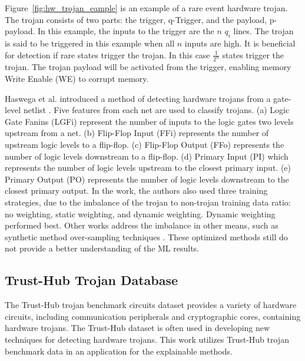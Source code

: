 Figure~\ref{fig:hw_trojan_eample} is an example of a rare event hardware trojan.
The trojan consists of two parts: the trigger, q-Trigger, and the payload,
p-payload. In this example, the inputs to the trigger are the $n$ $q_i$ lines.
The trojan is said to be triggered in this example when all $n$ inputs are high.
It is beneficial for detection if rare states trigger the trojan. In this case
$\frac{1}{2^n}$ states trigger the trojan. The trojan payload will be activated
from the trigger, enabling memory Write Enable (WE) to corrupt
memory\cite{4484928}.

Haswega et al. introduced a method of detecting hardware trojans from a
gate-level netlist \cite{7604700, hasegawa2020hardware}. Five features from each
net are used to classify trojans. (a) Logic Gate Fanins (LGFi) represent the
number of inputs to the logic gates two levels upstream from a net. (b)
Flip-Flop Input (FFi) represents the number of upstream logic levels to a
flip-flop. (c) Flip-Flop Output (FFo) represents the number of logic levels
downstream to a flip-flop. (d) Primary Input (PI) which represents the number of
logic levels upstream to the closest primary input. (e) Primary Output (PO)
represents the number of logic levels downstream to the closest primary output.
In the work, the authors also used three training strategies, due to the
imbalance of the trojan to non-trojan training data ratio: no weighting, static
weighting, and dynamic weighting. Dynamic weighting performed best. Other works
address the imbalance in other means, such as synthetic method over-sampling
techniques \cite{10444240}. These optimized methods still do not provide a
better understanding of the ML results.

\subsection{Trust-Hub Trojan Database}

The Trust-Hub trojan benchmark circuits dataset provides a variety of hardware
circuits, including communication peripherals and cryptographic cores,
containing hardware trojans. The Trust-Hub dataset is often used in developing
new techniques for detecting hardware trojans\cite{6657085,
shakya2017benchmarking, slayback2015computer, px6s-sm21-22}. This work utilizes
Trust-Hub trojan benchmark data in an application for the explainable methods.

